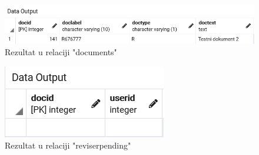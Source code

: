 \begin{figure}[H]
	\centering
	\includegraphics[scale=0.5]{./slike/baza7doc.png}
	\caption{Rezultat u relaciji "documents"}
	\label{fig:BAZA7b}
\end{figure}
\begin{figure}[H]
	\centering
	\includegraphics[scale=0.5]{./slike/baza7rp.png}
	\caption{Rezultat u relaciji "reviserpending"}
	\label{fig:BAZA7c}
\end{figure}


